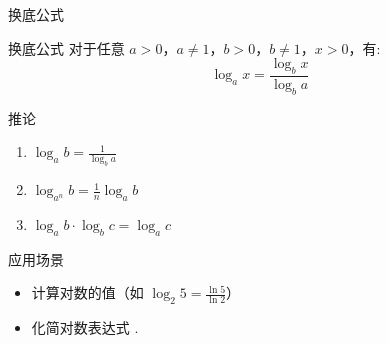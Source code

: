   
  
  
  \begin{frame}{换底公式}
    \begin{block}{换底公式}
        对于任意 $a > 0$，$a \neq 1$，$b > 0$，$b \neq 1$，$x > 0$，有:
        \[
        \log_a x = \frac{\log_b x}{\log_b a}
        \]
    \end{block}
    
    \begin{alertblock}{推论}
        \begin{enumerate}
            \item $\log_a b = \frac{1}{\log_b a}$
            \item $\log_{a^n} b = \frac{1}{n} \log_a b$
            \item $\log_a b \cdot \log_b c = \log_a c$
        \end{enumerate}
    \end{alertblock}
    
    \begin{exampleblock}{应用场景}
        \begin{itemize}
            \item 计算对数的值（如 $\log_2 5 = \frac{\ln 5}{\ln 2}$）
            \item 化简对数表达式 .
        \end{itemize}
    \end{exampleblock}
  \end{frame}
  
  
  
